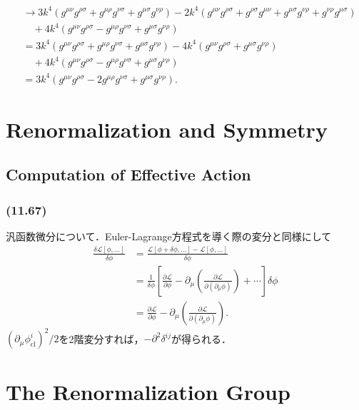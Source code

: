 \begin{align*}
  &\to 3 k^4 (g^{\mu\nu}g^{\rho\sigma} + g^{\mu\rho}g^{\nu\sigma} + g^{\mu\sigma}g^{\nu\rho})
  - 2k^4 (g^{\mu\nu} g^{\rho\sigma} + g^{\rho\sigma} g^{\mu\nu} + g^{\mu\sigma} g^{\nu\rho} + g^{\nu \rho} g^{\mu\sigma}) \\
  & \quad + 4k^4 (g^{\mu\nu}g^{\rho\sigma} - g^{\mu\rho}g^{\nu\sigma} + g^{\mu\sigma}g^{\nu\rho}) \\
  &= 3 k^4 (g^{\mu\nu}g^{\rho\sigma} + g^{\mu\rho}g^{\nu\sigma} + g^{\mu\sigma}g^{\nu\rho})
  - 4k^4 (g^{\mu\nu} g^{\rho\sigma} + g^{\mu\sigma} g^{\nu\rho}) \\
  & \quad + 4k^4 (g^{\mu\nu}g^{\rho\sigma} - g^{\mu\rho}g^{\nu\sigma} + g^{\mu\sigma}g^{\nu\rho}) \\
  &= 3 k^4 (g^{\mu\nu}g^{\rho\sigma} - 2g^{\mu\rho}g^{\nu\sigma} + g^{\mu\sigma}g^{\nu\rho}) .
\end{align*}

\chapter{Renormalization and Symmetry}
\setcounter{section}{3}
\section{Computation of Effective Action}
\subsection{(11.67)}
汎函数微分について．Euler-Lagrange方程式を導く際の変分と同様にして
\begin{align*}
  \frac{\delta \mathcal{L}[\phi, \ldots]}{\delta \phi}
  &= \frac{\mathcal{L}[\phi + \delta \phi, \ldots] - \mathcal{L}[\phi, \ldots]}{\delta \phi} \\
  &= \frac{1}{\delta \phi} \left[ \frac{\partial \mathcal{L}}{\partial \phi} - \partial_\mu \left( \frac{\partial \mathcal{L}}{\partial(\partial_\mu \phi)} \right) + \cdots \right] \delta \phi \\
  &= \frac{\partial \mathcal{L}}{\partial \phi} - \partial_\mu \left( \frac{\partial \mathcal{L}}{\partial(\partial_\mu \phi)} \right) .
\end{align*}
$(\partial_\mu \phi_\text{cl}^i)^2/2$を2階変分すれば，$-\partial^2 \delta^{ij}$が得られる．

\chapter{The Renormalization Group}
